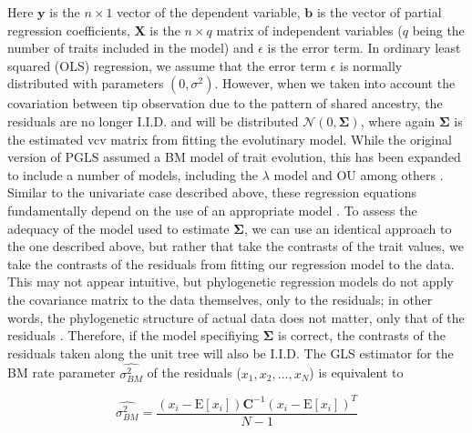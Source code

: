 \documentclass[12pt]{article}
\begin{document}
Here $\mathbf{y}$ is the $n \times 1$ vector of the dependent variable, $\mathbf{b}$ is the vector of partial regression coefficients, $\mathbf{X}$ is the $n \times q$ matrix of independent variables ($q$ being the number of traits included in the model) and $\epsilon$ is the error term. In ordinary least squared (OLS) regression, we assume that the error term $\epsilon$ is normally distributed with parameters $(0, \sigma^2)$. However, when we taken into account the covariation between tip observation due to the pattern of shared ancestry, the residuals are no longer I.I.D. and will be distributed $\mathcal{N} (0, \mathbf{\Sigma})$, where again $\mathbf{\Sigma}$ is the estimated vcv matrix from fitting the evolutinary model. While the original version of PGLS assumed a BM model of trait evolution, this has been expanded to include a number of models, including the $\lambda$ model \citep{Pagel1997, Revell2010, Freckleton2011} and OU \citep[e.g.][]{Hansen2008} among others \citep[see also][]{Lynch1991, Hadfield2010}. Similar to the univariate case described above, these regression equations fundamentally depend on the use of an appropriate model \citep{Hansen2012}. To assess the adequacy of the model used to estimate $\mathbf{\Sigma}$, we can use an identical approach to the one described above, but rather that take the contrasts of the trait values, we take the contrasts of the residuals from fitting our regression model to the data. This may not appear intuitive, but phylogenetic regression models do not apply the covariance matrix to the data themselves, only to the residuals; in other words, the phylogenetic structure of actual data does not matter, only that of the residuals \citep{Rohlf2001}. Therefore, if the model specifiying $\mathbf{\Sigma}$ is correct, the contrasts of the residuals taken along the unit tree will also be I.I.D. The GLS estimator for the  BM rate parameter $\hat{\sigma^2_{BM}}$ of the residuals ($x_1, x_2, \ldots , x_N$) is equivalent to

\begin{equation}
\hat{\sigma^2_{BM}} = \frac{(x_i - \mathrm{E}[x_i])\mathbf{C}^{-1}(x_i - \mathrm{E}[x_i])^{T}}{N-1} 
\end{equation}
\end{document}
